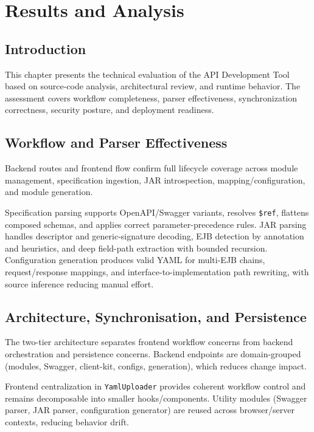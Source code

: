 \chapter{Results and Analysis}

\section{Introduction}

This chapter presents the technical evaluation of the API Development Tool based on source-code analysis, architectural review, and runtime behavior. The assessment covers workflow completeness, parser effectiveness, synchronization correctness, security posture, and deployment readiness.

\section{Workflow and Parser Effectiveness}

Backend routes and frontend flow confirm full lifecycle coverage across module management, specification ingestion, JAR introspection, mapping/configuration, and module generation.

Specification parsing supports OpenAPI/Swagger variants, resolves \texttt{\$ref}, flattens composed schemas, and applies correct parameter-precedence rules. JAR parsing handles descriptor and generic-signature decoding, EJB detection by annotation and heuristics, and deep field-path extraction with bounded recursion. Configuration generation produces valid YAML for multi-EJB chains, request/response mappings, and interface-to-implementation path rewriting, with source inference reducing manual effort.

\section{Architecture, Synchronisation, and Persistence}

The two-tier architecture separates frontend workflow concerns from backend orchestration and persistence concerns. Backend endpoints are domain-grouped (modules, Swagger, client-kit, configs, generation), which reduces change impact.

Frontend centralization in \texttt{YamlUploader} provides coherent workflow control and remains decomposable into smaller hooks/components. Utility modules (Swagger parser, JAR parser, configuration generator) are reused across browser/server contexts, reducing behavior drift.

